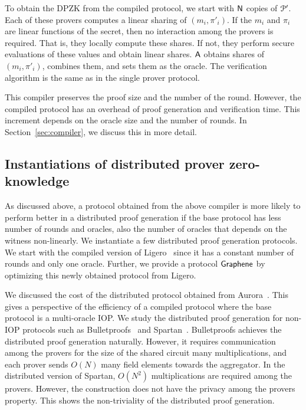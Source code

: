 To obtain the DPZK from the compiled protocol, we start with $\mathsf{N}$ copies of $\mathcal{P}'$. Each of these provers computes a linear sharing of $(m_i, \pi'_i)$. If the $m_i$ and $\pi_i$ are linear functions of the secret, then no interaction among the provers is required. That is, they locally compute these shares. If not, they perform secure evaluations of these values and obtain linear shares. $\mathsf{A}$ obtains shares of $(m_i, \pi'_i)$, combines them, and sets them as the oracle. The verification algorithm is the same as in the single prover protocol. 

This compiler preserves the proof size and the number of the round. However, the compiled protocol has an overhead of proof generation and verification time. This increment depends on the oracle size and the number of rounds. In Section~\ref{sec:compiler}, we discuss this in more detail.


\subsection{Instantiations of distributed prover zero-knowledge}
As discussed above, a protocol obtained from the above compiler is more likely to perform better in a distributed proof generation if the base protocol has less number of rounds and oracles, also the number of oracles that depends on the witness non-linearly. We instantiate a few distributed proof generation protocols. We start with the compiled version of Ligero~\cite{ligero} since it has a constant number of rounds and only one oracle. Further, we provide a protocol $\textsf{Graphene}$ by optimizing this newly obtained protocol from Ligero. 

We discussed the cost of the distributed protocol obtained from Aurora~\cite{aurora}. This gives a perspective of the efficiency of a compiled protocol where the base protocol is a multi-oracle IOP.
We study the distributed proof generation for non-IOP protocols such as Bulletproofs~\cite{bulletproofs} and Spartan~\cite{spartan}. Bulletproofs achieves the distributed proof generation naturally. However, it requires communication among the provers for the size of the shared circuit many multiplications, and each prover sends $O(N)$ many field elements towards the aggregator. In the distributed version of Spartan, $O(N^2)$ multiplications are required among the provers. However, the construction does not have the privacy among the provers property. This shows the non-triviality of the distributed proof generation. 

